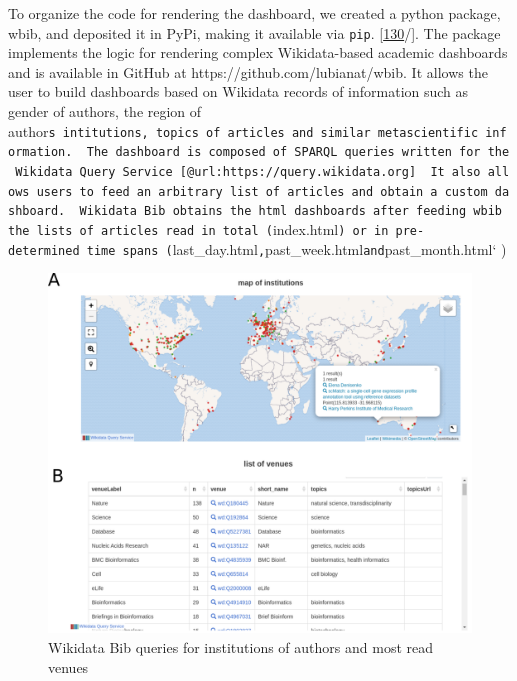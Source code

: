 To organize the code for rendering the dashboard, we created a python package, wbib, and deposited it in PyPi, making it available via \texttt{pip}. {[}\protect\hyperlink{ref-6chnW6cc}{130}/{]}.
The package implements the logic for rendering complex Wikidata-based academic dashboards and is available in GitHub at https://github.com/lubianat/wbib.
It allows the user to build dashboards based on Wikidata records of information such as gender of authors, the region of author\texttt{s\ intitutions,\ topics\ of\ articles\ and\ similar\ metascientific\ information.\ \ The\ dashboard\ is\ composed\ of\ SPARQL\ queries\ written\ for\ the\ Wikidata\ Query\ Service\ {[}@url:https://query.wikidata.org{]}\ \ It\ also\ allows\ users\ to\ feed\ an\ arbitrary\ list\ of\ articles\ and\ obtain\ a\ custom\ dashboard.\ \ Wikidata\ Bib\ obtains\ the\ html\ dashboards\ after\ feeding\ wbib\ the\ lists\ of\ articles\ read\ in\ total\ (}index.html\texttt{)\ or\ in\ pre-determined\ time\ spans\ (}last\_day.html\texttt{,}past\_week.html\texttt{and}past\_month.html` )

\begin{figure}
\hypertarget{fig:dashboard}{%
\centering
\includegraphics{images/wikidata_bib_display.png}
\caption{Wikidata Bib queries for institutions of authors and most read venues}\label{fig:dashboard}
}
\end{figure}

